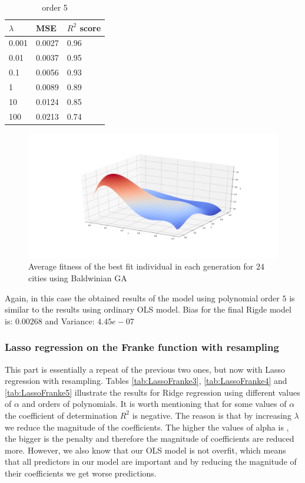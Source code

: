 \documentclass [11pt]{article}
\begin{document}
\begin{table}[H]
\centering
\begin{tabular}{lll}
\hline
$\lambda$ & MSE    & $R^{2}$ score \\ \hline
0.001     & 0.0027 & 0.96          \\
0.01      & 0.0037 & 0.95          \\
0.1       & 0.0056 & 0.93          \\
1         & 0.0089 & 0.89          \\
10        & 0.0124 & 0.85          \\
100       & 0.0213 & 0.74          \\ \hline
\end{tabular}
\caption{order 5}
\label{tab:ridge5}
\end{table}

\begin{figure}[H]
\centering
\includegraphics[width=1\textwidth]{figures/RidgeFranke.png}
        \caption{Average fitness of the best fit individual in each generation for $24$ cities using Baldwinian GA}
        \label{fig:RidgeFranke}
\end{figure}
Again, in this case the obtained results of the model using polynomial order $5$ is similar to the results using ordinary OLS model. Bias for the final Rigde model is: $0.00268$ and Variance: $4.45e-07$


\subsubsection{Lasso regression on the Franke function  with resampling}
 
This part is essentially a repeat of the previous two ones, but now with Lasso regression with resampling. Tables \ref{tab:LassoFranke3}, \ref{tab:LassoFranke4} and \ref{tab:LassoFranke5} illustrate the results for Ridge regression using different values of $\alpha$ and orders of polynomials. It is worth mentioning that for some values of $\alpha$ the coefficient of determination $R^{2}$ is negative. The reason is that by increasing $\lambda$ we reduce the magnitude of the coefficients. The higher the values of alpha is , the bigger is the penalty and therefore the magnitude of coefficients are reduced more. However, we also know that our OLS model is not overfit, which means that all predictors in our model are important and by reducing the magnitude of their coefficients we get worse predictions. 
\end{document}
